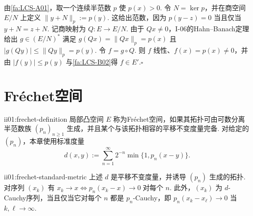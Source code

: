 \begin{FAProof}
由\autoref{fa:LCS-A01}，取一个连续半范数 \(\displaystyle p\) 使 \(\displaystyle p(x)>0\). 令 \(\displaystyle N=\ker p\)，并在商空间 \(\displaystyle E/N\) 上定义 \(\displaystyle \|y+N\|_p:=p(y)\). 这给出范数，因为 \(\displaystyle p(y-z)=0\) 当且仅当 \(\displaystyle y+N=z+N\). 记商映射为 \(\displaystyle Q:E\to E/N\). 由于 \(\displaystyle Qx\neq0\)，I-06的Hahn--Banach定理给出 \(\displaystyle g\in(E/N)^*\) 满足 \(\displaystyle g(Qx)=\|Qx\|_p=p(x)\) 且 \(\displaystyle |g(Qy)|\leqslant\|Qy\|_p=p(y)\). 令 \(\displaystyle f=g\circ Q\). 则 \(\displaystyle f\) 线性、\(\displaystyle f(x)=p(x)\neq0\)，并由 \(\displaystyle |f(y)|\leqslant p(y)\) 与\autoref{fa:LCS-B02}得 \(\displaystyle f\in E'\).\hfill\(\square\)
\end{FAProof}

\section{Fr\'echet空间}\label{sec:ii01-frechet}

\begin{FADefinition}[A][Fr\'echet空间]{ii01:frechet-definition}
局部凸空间 \(\displaystyle E\) 称为Fr\'echet空间，如果其拓扑可由可数分离半范数族 \(\displaystyle (p_n)_{n\geqslant1}\) 生成，并且某个与该拓扑相容的平移不变度量完备. 对给定的 \(\displaystyle (p_n)\)，本章使用标准度量
\[
d(x,y)
:=
\sum_{n=1}^{\infty}
2^{-n}\min\{1,p_n(x-y)\}.
\]
\end{FADefinition}

\begin{FAProposition}[A][Fr\'echet标准度量]{ii01:frechet-standard-metric}
上述 \(\displaystyle d\) 是平移不变度量，并诱导 \(\displaystyle (p_n)\) 生成的拓扑. 对序列 \(\displaystyle (x_k)\) 有
\(\displaystyle x_k\to x \Longleftrightarrow p_n(x_k-x)\to0 \;\text{对每个 }n.\)
此外，\(\displaystyle (x_k)\) 为 \(\displaystyle d\)-Cauchy序列，当且仅当它对每个 \(\displaystyle n\) 都是 \(\displaystyle p_n\)-Cauchy，即 \(\displaystyle p_n(x_k-x_\ell)\to0\) 当 \(\displaystyle k,\ell\to\infty\).
\end{FAProposition}

